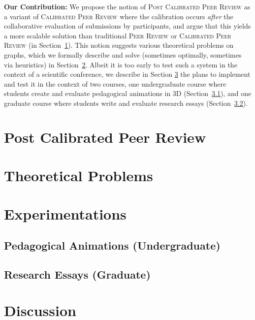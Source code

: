 \documentclass[usletter]{llncs}
\begin{document}
\textbf{Our Contribution:}
%
We propose the notion of \textsc{Post Calibrated Peer Review} as a variant of \textsc{Calibrated Peer Review} where the calibration occurs \emph{after} the collaborative evaluation of submissions by participants, and argue that this yields a more scalable solution than traditional \textsc{Peer Review} or \textsc{Calibrated Peer Review} (in Section~\ref{sec:pcpr}).
%
This notion suggests various theoretical problems on graphs, which we formally describe and solve (sometimes optimally, sometimes via heuristics) in Section~\ref{sec:TheoreticalProblems}.
%
Albeit it is too early to test such a system in the context of a scientific conference, we describe in Section \ref{sec:experimentations} the plans to implement and test it in the context of two courses, one undergraduate course where students create and evaluate pedagogical animations in 3D (Section~\ref{sec:pedag-anim}), and one graduate course where students write and evaluate research essays (Section~\ref{sec:research-essays}).


\section{Post Calibrated Peer Review}
\label{sec:pcpr}

\section{Theoretical Problems}
\label{sec:TheoreticalProblems}

\section{Experimentations}
\label{sec:experimentations}


\subsection{Pedagogical Animations (Undergraduate)}
\label{sec:pedag-anim}
\subsection{Research Essays (Graduate)}
\label{sec:research-essays}

\section{Discussion}
\label{sec:discussion}
\end{document}
